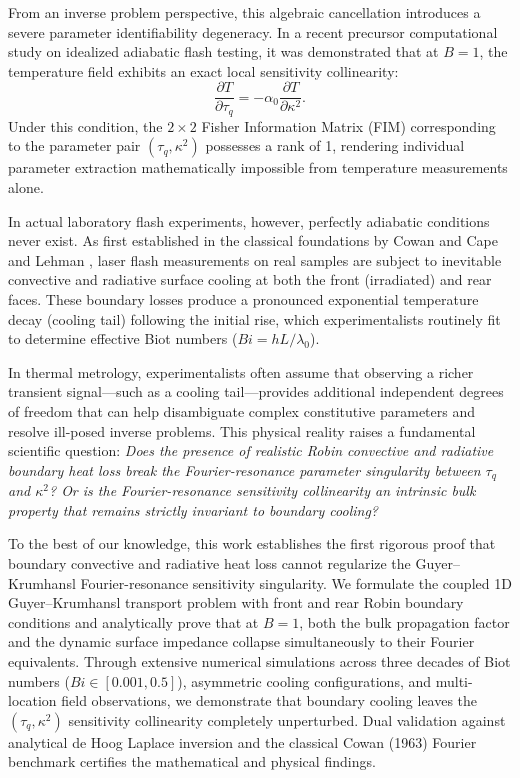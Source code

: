 \documentclass[review,12pt]{article}
\begin{document}
From an inverse problem perspective, this algebraic cancellation introduces a severe parameter identifiability degeneracy. In a recent precursor computational study on idealized adiabatic flash testing, it was demonstrated that at $B = 1$, the temperature field exhibits an exact local sensitivity collinearity:
\begin{equation}
\frac{\partial T}{\partial \tau_q} = -\alpha_0 \frac{\partial T}{\partial \kappa^2}.
\label{eq:collinearity_intro}
\end{equation}
Under this condition, the $2 \times 2$ Fisher Information Matrix (FIM) corresponding to the parameter pair $(\tau_q, \kappa^2)$ possesses a rank of 1, rendering individual parameter extraction mathematically impossible from temperature measurements alone.

In actual laboratory flash experiments, however, perfectly adiabatic conditions never exist. As first established in the classical foundations by Cowan \cite{cowan1963pulse} and Cape and Lehman \cite{cape1963temperature}, laser flash measurements on real samples are subject to inevitable convective and radiative surface cooling at both the front (irradiated) and rear faces. These boundary losses produce a pronounced exponential temperature decay (cooling tail) following the initial rise, which experimentalists routinely fit to determine effective Biot numbers ($Bi = h L / \lambda_0$).

In thermal metrology, experimentalists often assume that observing a richer transient signal—such as a cooling tail—provides additional independent degrees of freedom that can help disambiguate complex constitutive parameters and resolve ill-posed inverse problems. This physical reality raises a fundamental scientific question: \textit{Does the presence of realistic Robin convective and radiative boundary heat loss break the Fourier-resonance parameter singularity between $\tau_q$ and $\kappa^2$? Or is the Fourier-resonance sensitivity collinearity an intrinsic bulk property that remains strictly invariant to boundary cooling?}

To the best of our knowledge, this work establishes the first rigorous proof that boundary convective and radiative heat loss cannot regularize the Guyer--Krumhansl Fourier-resonance sensitivity singularity. We formulate the coupled 1D Guyer--Krumhansl transport problem with front and rear Robin boundary conditions and analytically prove that at $B = 1$, both the bulk propagation factor and the dynamic surface impedance collapse simultaneously to their Fourier equivalents. Through extensive numerical simulations across three decades of Biot numbers ($Bi \in [0.001, 0.5]$), asymmetric cooling configurations, and multi-location field observations, we demonstrate that boundary cooling leaves the $(\tau_q, \kappa^2)$ sensitivity collinearity completely unperturbed. Dual validation against analytical de Hoog Laplace inversion and the classical Cowan (1963) Fourier benchmark certifies the mathematical and physical findings.
\end{document}
